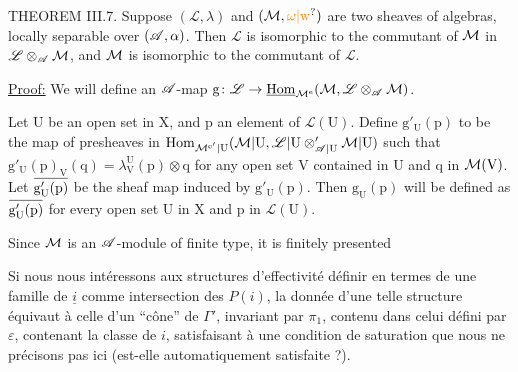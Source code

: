 THEOREM III.7. Suppose $(\mathscr{L},\lambda)$ and $(\handwritten{\mathcal{M}},\unsure{\omega|\mathrm w})$ are two sheaves of algebras, locally separable over $(\mathscr{A},\alpha)$. Then $\mathscr{L}$ is isomorphic to the commutant of $\mathcal{M}$ in $\mathscr{L}\otimes_{\mathscr{A}}\mathcal{M}$, and $\mathcal{M}$ is isomorphic to the commutant of $\mathscr{L}$.

\uline{Proof:} We will define an $\mathscr{A}$-map $\mathrm{g}\colon \mathscr{L}\to \underline{\mathrm{Hom}}_{\mathcal{M}^{\mathrm e}}(\mathcal{M},\mathscr{L}\otimes_{\mathscr{A}}\mathcal{M})$.

Let $\mathrm U$ be an open set in $\mathrm X$, and $\mathrm p$ an element of $\mathscr{L}(\mathrm U)$. Define $\mathrm{g}'_{\mathrm U}(\mathrm p)$ to be the map of presheaves in $\mathrm{Hom}_{\mathcal{M}^{\mathrm e'}|\mathrm U}(\mathcal{M}|\mathrm U,\mathscr{L}|\mathrm U\otimes_{\mathscr{A}|\mathrm U}^{\prime}\mathcal{M}|\mathrm U)$ such that $\mathrm{g}'_{\mathrm U}(\mathrm p)_{\mathrm V}(\mathrm q)=\lambda_{\mathrm V}^{\mathrm U}(\mathrm p)\otimes\mathrm q$ for any open set $\mathrm V$ contained in $\mathrm U$ and $\mathrm q$ in $\mathcal{M}(\mathrm V)$. Let $\overset{\handwritten{\rule{2.4em}{0.4pt}}}{\mathrm{g}'_{\mathrm U}(\mathrm p)}$ be the sheaf map induced by $\mathrm{g}'_{\mathrm U}(\mathrm p)$. Then $\mathrm{g}_{\mathrm U}(\mathrm p)$ will be defined as $\overset{\handwritten{\rule{2.4em}{0.4pt}}}{\mathrm{g}'_{\mathrm U}(\mathrm p)}$ for every open set $\mathrm U$ in $\mathrm X$ and $\mathrm p$ in $\mathscr{L}(\mathrm U)$.

Since $\mathcal{M}$ is an $\mathscr{A}$-module of finite type, it is finitely presented

Si nous nous intéressons aux structures d'effectivité  définir  en termes de  une famille de $\underline{i}$ comme intersection des $P(i)$,  la donnée d'une telle structure équivaut à celle d'un ``cône'' de $\Gamma'$, invariant par $\pi_1$, contenu  dans celui défini par $\varepsilon$,
contenant la classe de $i$, satisfaisant à une condition de  saturation que nous ne précisons pas ici (est-elle automatiquement satisfaite ?).

